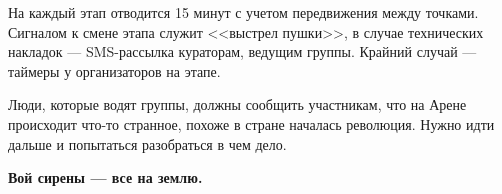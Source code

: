 
\par На каждый этап отводится 15 минут с учетом передвижения между точками. Сигналом к смене этапа служит <<выстрел пушки>>, в случае технических накладок --- SMS-рассылка кураторам, ведущим группы. Крайний случай --- таймеры у организаторов на этапе.

\par Люди, которые водят группы, должны сообщить участникам, что на Арене происходит что-то странное, похоже в стране началась революция. Нужно идти дальше и попытаться разобраться в чем дело.

\par \textbf{Вой сирены --- все на землю.}









